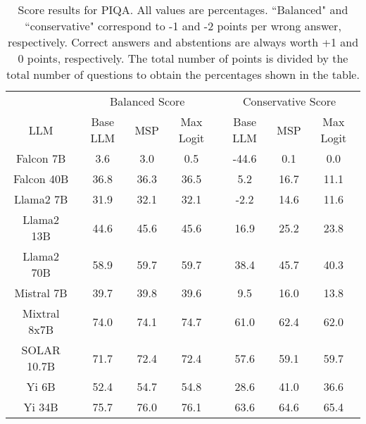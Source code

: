 \begin{table*}
\centering
\begin{tabular}{c|c|c|c|c|c|c}
& \multicolumn{3}{c|}{Balanced Score} & \multicolumn{3}{c}{Conservative Score} \\ 
LLM & Base LLM & MSP & Max Logit & Base LLM & MSP & Max Logit\\ \hline
Falcon 7B & 3.6 & 3.0 & 0.5 & -44.6 & 0.1 & 0.0\\
Falcon 40B & 36.8 & 36.3 & 36.5 & 5.2 & 16.7 & 11.1\\
Llama2 7B & 31.9 & 32.1 & 32.1 & -2.2 & 14.6 & 11.6\\
Llama2 13B & 44.6 & 45.6 & 45.6 & 16.9 & 25.2 & 23.8\\
Llama2 70B & 58.9 & 59.7 & 59.7 & 38.4 & 45.7 & 40.3\\
Mistral 7B & 39.7 & 39.8 & 39.6 & 9.5 & 16.0 & 13.8\\
Mixtral 8x7B & 74.0 & 74.1 & 74.7 & 61.0 & 62.4 & 62.0\\
SOLAR 10.7B & 71.7 & 72.4 & 72.4 & 57.6 & 59.1 & 59.7\\
Yi 6B & 52.4 & 54.7 & 54.8 & 28.6 & 41.0 & 36.6\\
Yi 34B & 75.7 & 76.0 & 76.1 & 63.6 & 64.6 & 65.4\\
\hline
\end{tabular}
\caption{Score results for PIQA. All values are percentages. ``Balanced" and ``conservative" correspond to -1 and -2 points per wrong answer, respectively. Correct answers and abstentions are always worth +1 and 0 points, respectively. The total number of points is divided by the total number of questions to obtain the percentages shown in the table.}
\label{tab:piqa_score}
\end{table*}
